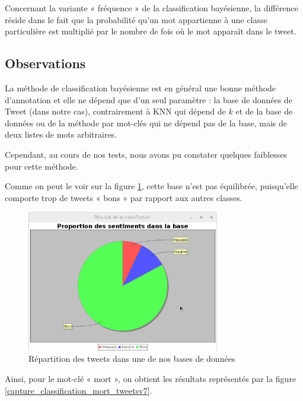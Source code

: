 \documentclass[12pt,a4paper]{report}
\begin{document}
Concernant la variante « fréquence » de la classification bayésienne, la
différence réside dans le fait que la probabilité qu'un mot appartienne à une
classe particulière est multiplié par le nombre de fois où le mot apparaît dans
le tweet.

\subsection{Observations}
La méthode de classification bayésienne est en général une bonne méthode
d'annotation et elle ne dépend que d'un seul paramètre : la base de données de
Tweet (dans notre cas), contrairement à KNN qui dépend de $k$ et de la base de
données ou de la méthode par mot-clés qui ne dépend pas de la base, mais de deux
listes de mots arbitraires.

Cependant, au cours de nos tests, nous avons pu constater quelques faiblesses
pour cette méthode.

Comme on peut le voir sur la figure \ref{capture_repartition_tweetsv7}, cette
base n'est pas équilibrée, puisqu'elle comporte trop de tweets « bons » par
rapport aux autres classes.

\begin{figure}
    \centering
    \includegraphics[width=0.75\textwidth]{img/resultats_classification_tweetsv7.eps}
    \caption{Répartition des tweets dans une de nos bases de données}
    \label{capture_repartition_tweetsv7}
\end{figure}

Ainsi, pour le mot-clé « mort », on obtient les résultats représentés par la
figure \ref{capture_classification_mort_tweetsv7}.
\end{document}

